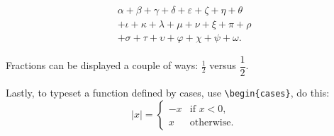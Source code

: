 \documentclass{article}
\begin{document}
\begin{multline*}
  \alpha + \beta + \gamma + \delta + \varepsilon + \zeta + \eta + \theta   \\
  + \iota + \kappa + \lambda + \mu + \nu + \xi + \pi + \rho \\
  + \sigma + \tau + \upsilon + \varphi + \chi + \psi + \omega.
\end{multline*}

Fractions can be displayed a couple of ways: \(\frac{1}{2}\) versus \(\dfrac{1}{2}\).

Lastly, to typeset a function defined by cases, use \verb~\begin{cases}~, do this:
\[
  |x| =
  \begin{cases}
    -x & \text{if \(x < 0\)}, \\
    x  & \text{otherwise}.
  \end{cases}
\]
\end{document}
